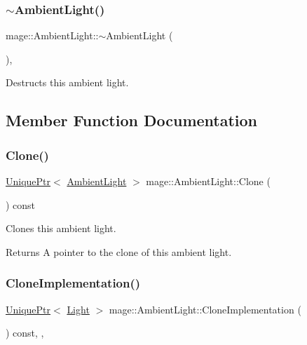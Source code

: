 \subsubsection{\texorpdfstring{$\sim$\+Ambient\+Light()}{~AmbientLight()}}
{\footnotesize\ttfamily mage\+::\+Ambient\+Light\+::$\sim$\+Ambient\+Light (\begin{DoxyParamCaption}{ }\end{DoxyParamCaption})\hspace{0.3cm}{\ttfamily [virtual]}, {\ttfamily [default]}}

Destructs this ambient light. 

\subsection{Member Function Documentation}
\hypertarget{classmage_1_1_ambient_light_a542a68882bc0807cf5f9a37391b9f44e}{}\label{classmage_1_1_ambient_light_a542a68882bc0807cf5f9a37391b9f44e} 
\subsubsection{\texorpdfstring{Clone()}{Clone()}}
{\footnotesize\ttfamily \hyperlink{namespacemage_a3316d7143a973e37adf1110f2e80ca31}{Unique\+Ptr}$<$ \hyperlink{classmage_1_1_ambient_light}{Ambient\+Light} $>$ mage\+::\+Ambient\+Light\+::\+Clone (\begin{DoxyParamCaption}{ }\end{DoxyParamCaption}) const}

Clones this ambient light.

\begin{DoxyReturn}{Returns}
A pointer to the clone of this ambient light. 
\end{DoxyReturn}
\hypertarget{classmage_1_1_ambient_light_a7223a4770653c20e662810b0956c6e51}{}\label{classmage_1_1_ambient_light_a7223a4770653c20e662810b0956c6e51} 
\subsubsection{\texorpdfstring{Clone\+Implementation()}{CloneImplementation()}}
{\footnotesize\ttfamily \hyperlink{namespacemage_a3316d7143a973e37adf1110f2e80ca31}{Unique\+Ptr}$<$ \hyperlink{classmage_1_1_light}{Light} $>$ mage\+::\+Ambient\+Light\+::\+Clone\+Implementation (\begin{DoxyParamCaption}{ }\end{DoxyParamCaption}) const\hspace{0.3cm}{\ttfamily [override]}, {\ttfamily [private]}, {\ttfamily [virtual]}}


